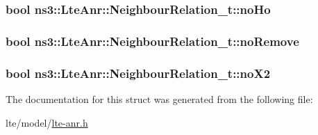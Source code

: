 \subsubsection[{\texorpdfstring{no\+Ho}{noHo}}]{\setlength{\rightskip}{0pt plus 5cm}bool ns3\+::\+Lte\+Anr\+::\+Neighbour\+Relation\+\_\+t\+::no\+Ho}\hypertarget{structns3_1_1LteAnr_1_1NeighbourRelation__t_a358a8de6a7af0d2cd1b7f3098a847b06}{}\label{structns3_1_1LteAnr_1_1NeighbourRelation__t_a358a8de6a7af0d2cd1b7f3098a847b06}
\subsubsection[{\texorpdfstring{no\+Remove}{noRemove}}]{\setlength{\rightskip}{0pt plus 5cm}bool ns3\+::\+Lte\+Anr\+::\+Neighbour\+Relation\+\_\+t\+::no\+Remove}\hypertarget{structns3_1_1LteAnr_1_1NeighbourRelation__t_ad83a00dc9c81d875b32839fd06df8b65}{}\label{structns3_1_1LteAnr_1_1NeighbourRelation__t_ad83a00dc9c81d875b32839fd06df8b65}
\subsubsection[{\texorpdfstring{no\+X2}{noX2}}]{\setlength{\rightskip}{0pt plus 5cm}bool ns3\+::\+Lte\+Anr\+::\+Neighbour\+Relation\+\_\+t\+::no\+X2}\hypertarget{structns3_1_1LteAnr_1_1NeighbourRelation__t_ada3a5ebbe0afc8b6a30bcdc1bc11ca84}{}\label{structns3_1_1LteAnr_1_1NeighbourRelation__t_ada3a5ebbe0afc8b6a30bcdc1bc11ca84}


The documentation for this struct was generated from the following file\+:\begin{DoxyCompactItemize}
\item 
lte/model/\hyperlink{lte-anr_8h}{lte-\/anr.\+h}\end{DoxyCompactItemize}
